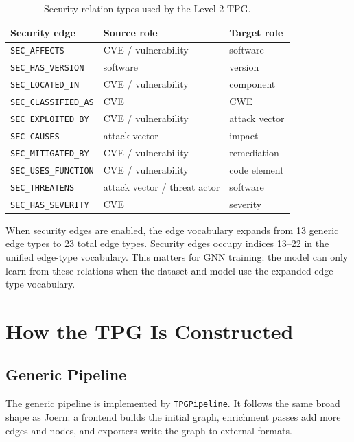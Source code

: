 \documentclass[11pt]{article}
\begin{document}
\begin{table}[h]
\centering
\small
\begin{tabular}{lll}
\toprule
Security edge & Source role & Target role \\
\midrule
\texttt{SEC\_AFFECTS} & CVE / vulnerability & software \\
\texttt{SEC\_HAS\_VERSION} & software & version \\
\texttt{SEC\_LOCATED\_IN} & CVE / vulnerability & component \\
\texttt{SEC\_CLASSIFIED\_AS} & CVE & CWE \\
\texttt{SEC\_EXPLOITED\_BY} & CVE / vulnerability & attack vector \\
\texttt{SEC\_CAUSES} & attack vector & impact \\
\texttt{SEC\_MITIGATED\_BY} & CVE / vulnerability & remediation \\
\texttt{SEC\_USES\_FUNCTION} & CVE / vulnerability & code element \\
\texttt{SEC\_THREATENS} & attack vector / threat actor & software \\
\texttt{SEC\_HAS\_SEVERITY} & CVE & severity \\
\bottomrule
\end{tabular}
\caption{Security relation types used by the Level 2 TPG.}
\end{table}

When security edges are enabled, the edge vocabulary expands from 13 generic
edge types to 23 total edge types. Security edges occupy indices 13--22 in the
unified edge-type vocabulary. This matters for GNN training: the model can only
learn from these relations when the dataset and model use the expanded
edge-type vocabulary.

\section{How the TPG Is Constructed}

\subsection{Generic Pipeline}

The generic pipeline is implemented by \texttt{TPGPipeline}. It follows the
same broad shape as Joern: a frontend builds the initial graph, enrichment
passes add more edges and nodes, and exporters write the graph to external
formats.
\end{document}
